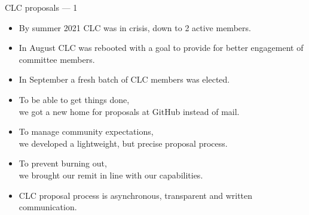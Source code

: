 \documentclass[handout]{beamer}
\begin{document}
\begin{frame}{CLC proposals --- 1}

\begin{itemize}[<+->]
\item By summer 2021 CLC was in crisis, down to 2 active members.
\item In August CLC was rebooted with a goal to provide for better engagement
of committee members.
\item In September a fresh batch of CLC members was elected.
\bigskip
\item To be able to get things done, \\
      we got a new home for proposals at GitHub instead of mail.
\item To manage community expectations, \\
      we developed a lightweight, but precise proposal process.
\item To prevent burning out, \\
      we brought our remit in line with our capabilities.
\bigskip
\item CLC proposal process is asynchronous, transparent and written communication.
\end{itemize}

\end{frame}
\end{document}
